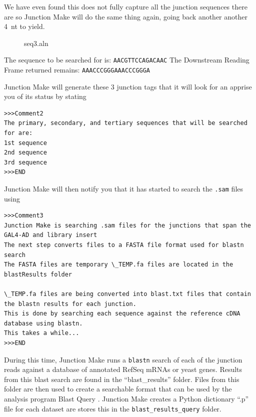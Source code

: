 \documentclass[11pt,fleqn]{book} %
\newcommand{\JunctionMake}{{\color{Blue} Junction Make }}
\newcommand{\BlastQuery}{{\color{ForestGreen} Blast Query }}
\begin{document}
\vspace{10pt}

We have even found this does not fully capture all the junction sequences there are so \JunctionMake will do the same thing  again, going back another another 4~nt to yield.

\begin{figure}[!ht]
\centering
\begin{texshade}{seq3.aln}
	\hideconsensus
	\hidenumbering
\end{texshade}
\end{figure}

The sequence to be searched for is: \texttt{AACGTTCCAGACAAC}
The Downstream Reading Frame returned remains: \texttt{AAACCCGGGAAACCCGGGA}

\vspace{15pt}

\JunctionMake will generate these 3 junction tags that it will look for an apprise you of its status by stating 
\begin{lstlisting}
>>>Comment2
The primary, secondary, and tertiary sequences that will be searched for are:
1st sequence
2nd sequence
3rd sequence
>>>END 
\end{lstlisting}

\JunctionMake will then notify you that it has started to search the \texttt{.sam} files using 
\begin{lstlisting}
>>>Comment3
Junction Make is searching .sam files for the junctions that span the GAL4-AD and library insert
The next step converts files to a FASTA file format used for blastn search
The FASTA files are temporary \_TEMP.fa files are located in the blastResults folder

\_TEMP.fa files are being converted into blast.txt files that contain the blastn results for each junction.
This is done by searching each sequence against the reference cDNA database using blastn.
This takes a while...
>>>END
\end{lstlisting}


During this time, \JunctionMake runs a \texttt{blastn} search of each of the junction reads against a database of annotated RefSeq mRNAs or yeast genes. Results from this blast search are found in the ``blast\_results'' folder.  Files from this folder are then used to create a searchable format that can be used by the analysis program \BlastQuery. \JunctionMake creates a Python dictionary ``.p'' file for each dataset are stores this in the \texttt{blast\_results\_query} folder.  
\end{document}
